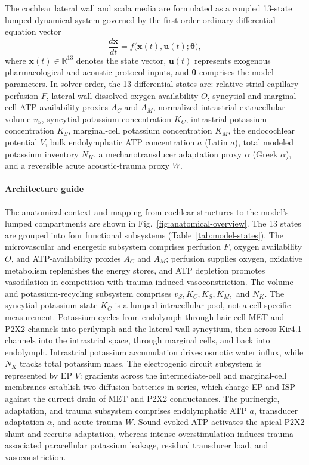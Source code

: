 \documentclass[final,5p,times]{elsarticle}
\begin{document}
The cochlear lateral wall and scala media are formulated as a coupled 13-state lumped dynamical system governed by the first-order ordinary differential equation vector
\begin{equation}
  \frac{d\mathbf{x}}{dt} = f\bigl(\mathbf{x}(t), \mathbf{u}(t); \boldsymbol{\theta}\bigr),
  \label{eq:ode}
\end{equation}
where \(\mathbf{x}(t) \in \mathbb{R}^{13}\) denotes the state vector, \(\mathbf{u}(t)\) represents exogenous pharmacological and acoustic protocol inputs, and \(\boldsymbol{\theta}\) comprises the model parameters. In solver order, the 13 differential states are: relative strial capillary perfusion \(F\), lateral-wall dissolved oxygen availability \(O\), syncytial and marginal-cell ATP-availability proxies \(A_C\) and \(A_M\), normalized intrastrial extracellular volume \(v_S\), syncytial potassium concentration \(K_C\), intrastrial potassium concentration \(K_S\), marginal-cell potassium concentration \(K_M\), the endocochlear potential \(V\), bulk endolymphatic ATP concentration \(a\) (Latin \(a\)), total modeled potassium inventory \(N_K\), a mechanotransducer adaptation proxy \(\alpha\) (Greek \(\alpha\)), and a reversible acute acoustic-trauma proxy \(W\).

\paragraph*{Architecture guide}
The anatomical context and mapping from cochlear structures to the model's lumped compartments are shown in Fig.~\ref{fig:anatomical-overview}. The 13 states are grouped into four functional subsystems (Table~\ref{tab:model-states}). The microvascular and energetic subsystem comprises perfusion \(F\), oxygen availability \(O\), and ATP-availability proxies \(A_C\) and \(A_M\); perfusion supplies oxygen, oxidative metabolism replenishes the energy stores, and ATP depletion promotes vasodilation in competition with trauma-induced vasoconstriction. The volume and potassium-recycling subsystem comprises \(v_S, K_C, K_S, K_M,\) and \(N_K\). The syncytial potassium state \(K_C\) is a lumped intracellular pool, not a cell-specific measurement. Potassium cycles from endolymph through hair-cell MET and P2X2 channels into perilymph and the lateral-wall syncytium, then across Kir4.1 channels into the intrastrial space, through marginal cells, and back into endolymph. Intrastrial potassium accumulation drives osmotic water influx, while \(N_K\) tracks total potassium mass. The electrogenic circuit subsystem is represented by EP \(V\): gradients across the intermediate-cell and marginal-cell membranes establish two diffusion batteries in series, which charge EP and ISP against the current drain of MET and P2X2 conductances. The purinergic, adaptation, and trauma subsystem comprises endolymphatic ATP \(a\), transducer adaptation \(\alpha\), and acute trauma \(W\). Sound-evoked ATP activates the apical P2X2 shunt and recruits adaptation, whereas intense overstimulation induces trauma-associated paracellular potassium leakage, residual transducer load, and vasoconstriction.
\end{document}
